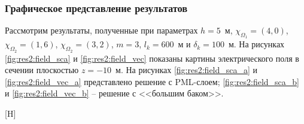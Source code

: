 \documentclass[a4paper,14pt]{article}
\makeatletter
\renewenvironment{figure}[1][\fps@figure]{
  \edef\@tempa{\noexpand\@float{figure}[#1]}
  \@tempa
  \addtocounter{foofigure}{1}
}{
  \end@float
}
\renewcommand{\Re}{\mathop{\mathrm{Re}}\nolimits}
\makeatother
\begin{document}
\subsubsection{Графическое представление результатов}
Рассмотрим результаты, полученные при параметрах $h=5$~м, $\chi_{\Omega_1} = (4, 0)$, $\chi_{\Omega_2} = (1, 6)$, $\chi_{\Omega_2} = (3, 2)$, $m=3$, $l_k = 600$~м и $\delta_k = 100$~м. На рисунках \ref{fig:res2:field_sca} и \ref{fig:res2:field_vec} показаны картины электрического поля в сечении плоскостью $z = -10$~м. На рисунках \ref{fig:res2:field_sca_a} и \ref{fig:res2:field_vec_a} представлено решение с PML-слоем; \ref{fig:res2:field_sca_b} и \ref{fig:res2:field_vec_b} -- решение с <<большим баком>>.

\begin{figure}[H]
	\centering
	~~
	\caption{$\Re(\mathbf{E}_y)$}
	\label{fig:res2:field_sca}
\end{figure}
\end{document}
